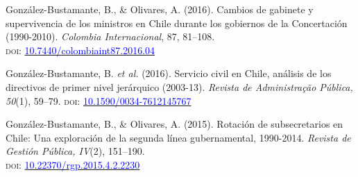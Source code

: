 \begin{publications}
\begin{benumerate}{8}
\item{\small Gonz\'alez-Bustamante, B., \& Olivares, A. (2016). Cambios de gabinete y supervivencia de los ministros en Chile durante los gobiernos de la Concertación (1990-2010). {\itshape Colombia Internacional}, 87, 81--108. \\ {\scshape doi}: \href{https://doi.org/10.7440/colombiaint87.2016.04}{\textcolor{blue}{10.7440/colombiaint87.2016.04}}}\vspace{1mm}

\item{\small Gonz\'alez-Bustamante, B. {\itshape et al.} (2016). Servicio civil en Chile, análisis de los directivos de primer nivel jerárquico (2003-13). {\itshape Revista de Administra\c{c}\~ao P\'ublica, 50}(1), 59--79. {\scshape doi}: \href{http://dx.doi.org/10.1590/0034-7612145767}{\textcolor{blue}{10.1590/0034-7612145767}}} \vspace{1mm}

\item{\small Gonz\'alez-Bustamante, B., \& Olivares, A. (2015). Rotación de subsecretarios en Chile: Una exploración de la segunda línea gubernamental, 1990-2014. {\itshape Revista de Gesti\'on P\'ublica, IV}(2), 151--190. \\ {\scshape doi}: \href{https://doi.org/10.22370/rgp.2015.4.2.2230}{\textcolor{blue}{10.22370/rgp.2015.4.2.2230}}} \vspace{1mm}

\end{benumerate}

\end{publications}
\pagebreak


